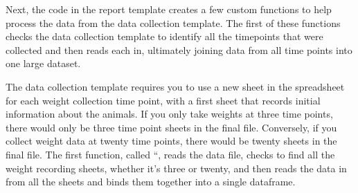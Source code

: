 \documentclass[
]{book}
\begin{document}
Next, the code in the report template creates a few custom functions to
help process the data from the data collection template. The first of these
functions checks the data collection template to identify all the timepoints
that were collected and then reads each in, ultimately joining data from
all time points into one large dataset.

The data collection template requires you to use a new sheet in the spreadsheet
for each weight collection time point, with a first sheet that records
initial information about the animals. If you only take weights at three
time points, there would only be three time point sheets in the final file.
Conversely, if you collect weight data at twenty time points, there would be
twenty sheets in the final file. The first function, called ``, reads the data file, checks
to find all the weight recording sheets, whether it's three or twenty, and then
reads the data in from all the sheets and binds them together into a single
dataframe.
\end{document}

